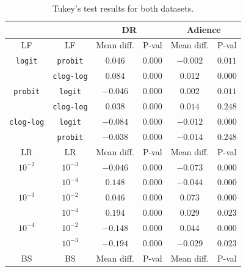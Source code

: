 \documentclass[preprint]{elsarticle}
\begin{document}
\begin{table}[!t]
	\caption{Tukey's test results for both datasets.}
	\label{table:Tukey}
	\centering
	\footnotesize
	\begin{tabular}{cccccc}
		\hline\hline
		&                   & \multicolumn{2}{c}{\textbf{DR}} & \multicolumn{2}{c}{\textbf{Adience}} \\ \hline
		LF         &        LF         & Mean diff. &        P-val        & Mean diff. &          P-val           \\ \hline
		\texttt{logit}   &  \texttt{probit}  &  $0.046$   &      $0.000$       &  $-0.002$  &         $0.011$         \\
		& \texttt{clog-log} &  $0.084$   &      $0.000$       &  $0.012$   &         $0.000$         \\
		\texttt{probit}  &  \texttt{logit}   &  $-0.046$  &      $0.000$       &  $0.002$   &         $0.011$         \\
		& \texttt{clog-log} &  $0.038$   &      $0.000$       &  $0.014$   &         $0.248$         \\
		\texttt{clog-log} &  \texttt{logit}   &  $-0.084$  &      $0.000$       &  $-0.012$  &         $0.000$         \\
		&  \texttt{probit}  &  $-0.038$  &      $0.000$       &  $-0.014$  &         $0.248$         \\ \hline\hline
		LR         &        LR         & Mean diff. &        P-val        & Mean diff. &          P-val           \\ \hline
		$10^{-2}$     &     $10^{-3}$     &  $-0.046$  &      $0.000$       &  $-0.073$  &         $0.000$         \\
		&     $10^{-4}$     &  $0.148$   &      $0.000$       &  $-0.044$  &         $0.000$         \\
		$10^{-3}$     &     $10^{-2}$     &  $0.046$   &      $0.000$       &  $0.073$   &         $0.000$         \\
		&     $10^{-4}$     &  $0.194$   &      $0.000$       &  $0.029$   &         $0.023$         \\
		$10^{-4}$     &     $10^{-2}$     &  $-0.148$  &      $0.000$       &  $0.044$   &         $0.000$         \\
		&     $10^{-3}$     &  $-0.194$  &      $0.000$       &  $-0.029$  &         $0.023$         \\ \hline\hline
		BS         &        BS         & Mean diff. &        P-val        & Mean diff. &          P-val           \\ \hline

\end{tabular}
\end{table}
\end{document}
